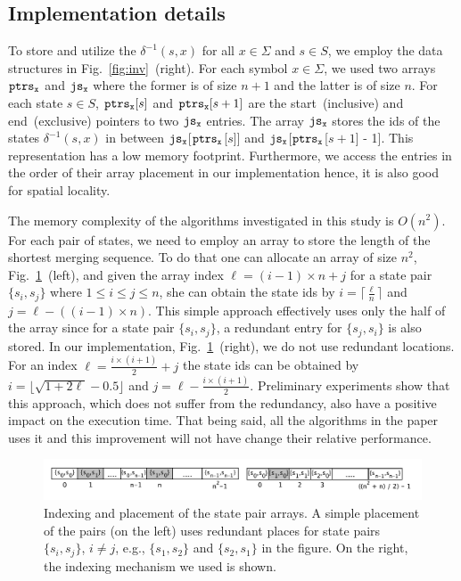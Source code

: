 \documentclass[12pt]{article}
\newcommand{\comment}[2]{{\color{red}{\bf (#1: #2)}}}
\begin{document}
\subsection{Implementation details}\label{subsec:imp}
\comment{sertac}{kopyala yapistir oldu burasi}
To store and utilize the  $\delta^{-1}(s,x)$ for all $x \in \Sigma$ and $s \in S$, we employ the data structures in Fig.~\ref{fig:inv}~(right). For each symbol $x \in \Sigma$, we used two arrays ${\tt ptrs_x}$ and ${\tt js_x}$ where the former is of size $n + 1$ and the latter is of size $n$. For each state $s \in S$, ${\tt ptrs_x}[s]$ and ${\tt ptrs_x}[s+1]$ are the start~(inclusive) and end~(exclusive) pointers to two ${\tt js_x}$ entries.  The array ${\tt js_x}$ stores the ids of the states $\delta^{-1}(s,x)$ in between ${\tt js_x}$[{$\tt ptrs_x$}[$s$]]  and ${\tt js_x}$[{$\tt ptrs_x$}[$s+1$] - 1]. This representation has a low memory footprint. Furthermore, we access the entries in the order of their array placement  in our implementation hence, it is also good for spatial locality.



The memory complexity of the algorithms investigated in this study is $O(n^2)$. For each pair of states, we need to employ an array to store the length of the shortest merging sequence. To do that one can allocate an array of size $n^2$, Fig.~\ref{fig:mem}~(left), and given the array index $\ell = (i-1) \times n + j$ for a state pair $\{s_i, s_j\}$ where $1  \leq i \leq j \leq n$, she can obtain the state ids by $i = \lceil{\frac{\ell}{n}} \rceil$  and $j =\ell - ((i -1) \times n)$. This simple approach effectively uses only the half of the array since for a state pair $\{s_i, s_j\}$, a redundant entry for $\{s_j, s_i\}$ is also stored. In our implementation, Fig.~\ref{fig:mem}~(right), we do not use redundant locations. For an index  $\ell = \frac{i \times (i+1)}{2} + j$ the state ids can be obtained by $i = \lfloor \sqrt{1 + 2\ell} - 0.5\rfloor$ and $j = \ell - \frac{i \times (i+1)}{2}$. Preliminary experiments show that this approach, which does not suffer from the redundancy,  also have a positive impact on the execution time. That being said, all the algorithms in the paper uses it and this improvement will not have change their relative performance. 

\begin{figure}
	\centering
	\includegraphics[width=\textwidth]{figs/memory.pdf}
	\caption{Indexing and placement of the state pair arrays. A simple placement of the pairs (on the left) uses redundant places for state pairs $\{s_i, s_j\}$, $i \neq j$, e.g., $\{s_1, s_2\}$ and $\{s_2, s_1\}$ in the figure. On the right, the indexing mechanism we used is shown.}
	\label{fig:mem}
	\vspace*{-3ex}
\end{figure}
\end{document}
